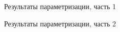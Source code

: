 \clearpage
\begin{figure}[h!]
	
	
	\caption{Результаты параметризации, часть 1}
	
	\label{fig:tab1}
	
\end{figure}

\clearpage
\begin{figure}[h!]
	
	
	\caption{Результаты параметризации, часть 2}
	
	\label{fig:tab2}
	
\end{figure}

